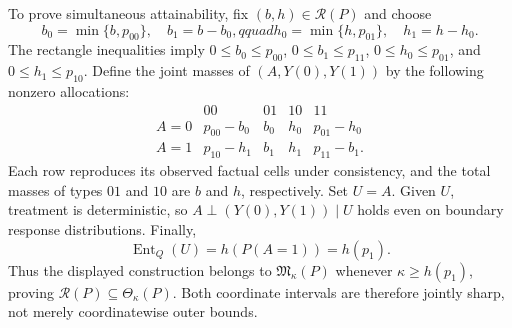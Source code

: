 To prove simultaneous attainability, fix \((b,h)\in\mathcal R(P)\) and choose
\[
 b_0=\min\{b,p_{00}\},\quad b_1=b-b_0,qquad
 h_0=\min\{h,p_{01}\},\quad h_1=h-h_0.
\]
The rectangle inequalities imply \(0\leq b_0\leq p_{00}\), \(0\leq b_1\leq p_{11}\), \(0\leq h_0\leq p_{01}\), and \(0\leq h_1\leq p_{10}\).  Define the joint masses of \((A,Y(0),Y(1))\) by the following nonzero allocations:
\[
 \begin{array}{c|cccc}
 &00&01&10&11\\ \hline
 A=0&p_{00}-b_0&b_0&h_0&p_{01}-h_0\\
 A=1&p_{10}-h_1&b_1&h_1&p_{11}-b_1.
 \end{array}
\]
Each row reproduces its observed factual cells under consistency, and the total masses of types \(01\) and \(10\) are \(b\) and \(h\), respectively.  Set \(U=A\).  Given \(U\), treatment is deterministic, so \(A\perp(Y(0),Y(1))\mid U\) holds even on boundary response distributions.  Finally,
\[
 \operatorname{Ent}_Q(U)=h(P(A=1))=h(p_1).
\]
Thus the displayed construction belongs to \(\mathfrak M_\kappa(P)\) whenever \(\kappa\geq h(p_1)\), proving \(\mathcal R(P)\subseteq\Theta_\kappa(P)\).  Both coordinate intervals are therefore jointly sharp, not merely coordinatewise outer bounds.